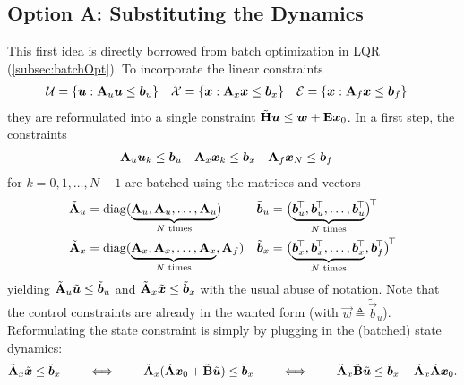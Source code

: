 		\subsection{Option A: Substituting the Dynamics}
			This first idea is directly borrowed from batch optimization in LQR (\autoref{subsec:batchOpt}). To incorporate the linear constraints
			\begin{align}
				\mathcal{U} &= \{ \bm{u} : \bm{\mathrm{A}}_u \bm{u} \leq \bm{b}_u \} &
				\mathcal{X} &= \{ \bm{x} : \bm{\mathrm{A}}_x \bm{x} \leq \bm{b}_x \} &
				\mathcal{E} &= \{ \bm{x} : \bm{\mathrm{A}}_f \bm{x} \leq \bm{b}_f \}
			\end{align}
			they are reformulated into a single constraint \( \tilde{\bm{\mathrm{H}}} \bm{u} \leq \bm{w} + \bm{\mathrm{E}} \bm{x}_0 \). In a first step, the constraints
			\begin{align}
				\bm{\mathrm{A}}_u \bm{u}_k &\leq \bm{b}_u &
				\bm{\mathrm{A}}_x \bm{x}_k &\leq \bm{b}_x &
				\bm{\mathrm{A}}_f \bm{x}_N &\leq \bm{b}_f
			\end{align}
			for \( k = 0, 1, \dots, N - 1 \) are batched using the matrices and vectors
			\begin{align}
				\tilde{\mat{A}}_u &= \diag(\underbrace{\mat{A}_u, \mat{A}_u, \dots, \mat{A}_u}_{N\text{ times}}) &
				\tilde{\vec{b}}_u &= \bigl(\underbrace{\vec{b}_u^\transposed, \vec{b}_u^\transposed, \dots, \vec{b}_u^\transposed}_{N\text{ times}}\bigr)^\transposed \\
				\tilde{\mat{A}}_x &= \diag(\underbrace{\mat{A}_x, \mat{A}_x, \dots, \mat{A}_x}_{N\text{ times}}, \mat{A}_f) &
				\tilde{\vec{b}}_x &= \bigl(\underbrace{\vec{b}_x^\transposed, \vec{b}_x^\transposed, \dots, \vec{b}_x^\transposed}_{N\text{ times}}, \vec{b}_f^\transposed\bigr)^\transposed
			\end{align}
			yielding \( \tilde{\bm{\mathrm{A}}}_u \tilde{\bm{u}} \leq \tilde{\bm{b}}_u \) and \( \tilde{\bm{\mathrm{A}}}_x \tilde{\bm{x}} \leq \tilde{\bm{b}}_x \) with the usual abuse of notation. Note that the control constraints are already in the wanted form (with \( \vec{w} \triangleq \tilde{\vec{b}}_u \)). Reformulating the state constraint is simply by plugging in the (batched) state dynamics:
			\begin{equation}
				\tilde{\bm{\mathrm{A}}}_x \tilde{\bm{x}} \leq \tilde{\bm{b}}_x
				\qquad\iff\qquad
				\tilde{\bm{\mathrm{A}}}_x (\tilde{\bm{\mathrm{A}}} \bm{x}_0 + \tilde{\bm{\mathrm{B}}} \tilde{\bm{u}}) \leq \tilde{\bm{b}}_x
				\qquad\iff\qquad
				\tilde{\bm{\mathrm{A}}}_x \tilde{\bm{\mathrm{B}}} \tilde{\bm{u}} \leq \tilde{\bm{b}}_x - \tilde{\bm{\mathrm{A}}}_x \tilde{\bm{\mathrm{A}}} \bm{x}_0.
			\end{equation}
